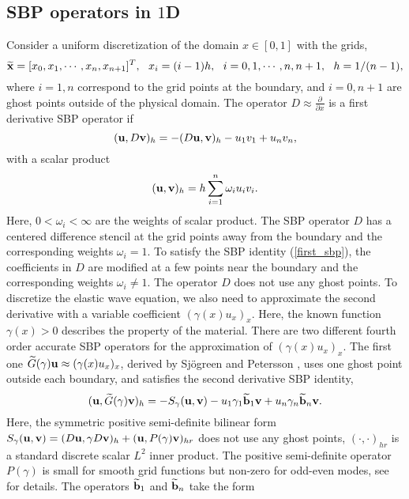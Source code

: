 \subsection{SBP operators in $1$D}\label{sec_sbp_1d}
Consider a uniform discretization of the domain $x\in[0,1]$ with the grids,
\[\widetilde
	{\bf x} = [x_0,x_1,\cdots,x_n,x_{n+1}]^T,\ \  x_i = (i-1)h,\ \ i = 0,1,\cdots,n,n+1,\ \ h = 1/(n-1),\]
where $i = 1,n$ correspond to the grid points at the boundary, and $i = 0,n+1$ are ghost points outside of the physical domain. The  operator $D \approx \frac{\partial }{\partial x}$ is a first derivative SBP operator \cite{Kreiss1974,Strand1994} if 
\begin{equation}\label{first_sbp}
({\bf u}, D{\bf v})_h = -(D{\bf u},{\bf v})_h - u_1v_1 + u_nv_n,
\end{equation}
with a scalar product
\begin{equation}\label{inner_product}
({\bf u},{\bf v})_h = h\sum_{i = 1}^{n}\omega_iu_iv_i.
\end{equation}
Here, $0<\omega_i < \infty $ are the weights of scalar product. The SBP operator $D$ has a centered difference stencil at the grid points away from the boundary and the corresponding weights $\omega_i = 1$. To satisfy the SBP identity (\ref{first_sbp}), the coefficients in $D$ are  modified at a few points near the boundary and the corresponding weights $\omega_i \neq 1$. The operator $D$ does not use any ghost points. To discretize the elastic wave equation, we also need to approximate the second derivative with a variable coefficient $(\gamma(x)u_x)_x$. Here, the known function $\gamma(x)>0$ describes the property of the material. There are two different fourth order accurate SBP operators for the approximation of $(\gamma(x)u_x)_x$. The first one $\widetilde{G}(\gamma){\bf u} \approx (\gamma(x)u_x)_x $, derived by Sj\"ogreen and Petersson \cite{sjogreen2012fourth}, uses one ghost point outside each boundary, and satisfies the second derivative SBP identity,
\begin{equation}\label{sbp_2nd_1}
({\bf u}, \widetilde{G}(\gamma){\bf v})_h = -S_\gamma({\bf u},{\bf v})-u_1\gamma_1\widetilde{\bf b}_1{\bf v} + u_n\gamma_n\widetilde{\bf b}_n {\bf v}.
\end{equation}
Here, the symmetric positive semi-definite bilinear form $S_\gamma({\bf u},{\bf v}) = (D{\bf u},\gamma D{\bf v})_h + ({\bf u}, P(\gamma){\bf v})_{hr}$ does not use any ghost points, $(\cdot,\cdot)_{hr}$ is a standard discrete scalar $L^2$ inner product. The positive semi-definite operator $P(\gamma)$ is small for smooth grid functions but non-zero for odd-even modes, see \cite{petersson2015wave,sjogreen2012fourth} for details. The operators $\widetilde{\bf b}_1$ and $\widetilde{\bf b}_n$ take the form %
